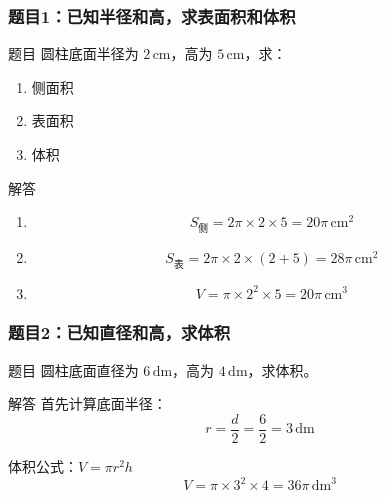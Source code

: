 \begin{frame}
    \frametitle{题目1：已知半径和高，求表面积和体积}
    \begin{block}{题目}
        圆柱底面半径为 \(2 \, \text{cm}\)，高为 \(5 \, \text{cm}\)，求：
        \begin{enumerate}
            \item 侧面积
            \item 表面积
            \item 体积
        \end{enumerate}
    \end{block}
    
    \vspace{0.5cm}
    \pause
    \begin{block}{解答}
        \begin{enumerate}
            \item
            \[
            S_{\text{侧}} = 2\pi \times 2 \times 5 = 20\pi \, \text{cm}^2
            \]
            
            \item 
            \[
            S_{\text{表}} = 2\pi \times 2 \times (2 + 5) = 28\pi \, \text{cm}^2
            \]
            
            \item 
            \[
            V = \pi \times 2^2 \times 5 = 20\pi \, \text{cm}^3
            \]
        \end{enumerate}
    \end{block}
\end{frame}



\begin{frame}
    \frametitle{题目2：已知直径和高，求体积}
    \begin{block}{题目}
        圆柱底面直径为 \(6 \, \text{dm}\)，高为 \(4 \, \text{dm}\)，求体积。
    \end{block}
    
    \vspace{0.5cm}
    \pause
    \begin{block}{解答}
        首先计算底面半径：
        \[
        r = \frac{d}{2} = \frac{6}{2} = 3 \, \text{dm}
        \]
        
        体积公式：\( V = \pi r^2 h \)
        \[
        V = \pi \times 3^2 \times 4 = 36\pi \, \text{dm}^3
        \]
    \end{block}
\end{frame}

